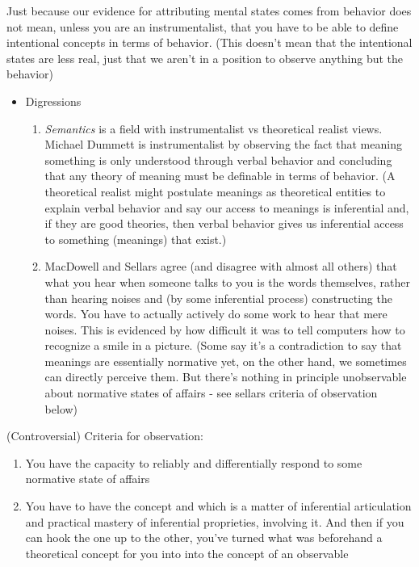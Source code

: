 Just because our evidence for attributing mental states comes from behavior does not mean, unless you are an instrumentalist, that you have to be able to define intentional concepts in terms of behavior. (This doesn't mean that the intentional states are less real, just that we aren't in a position to observe anything but the behavior)
\begin{itemize}
\item  Digressions
\begin{enumerate}
\item \emph{Semantics} is a field with instrumentalist vs theoretical realist views. Michael Dummett is instrumentalist by observing the fact that meaning something is only understood through verbal behavior and concluding that any theory of meaning must be definable in terms of behavior. (A theoretical realist might postulate meanings as theoretical entities to explain verbal behavior and say our access to meanings is inferential and, if they are good theories, then verbal behavior gives us inferential access to something (meanings) that exist.)
\item MacDowell and Sellars agree (and disagree with almost all others) that what you hear when someone talks to you is the words themselves, rather than hearing noises and (by some inferential process) constructing the words. You have to actually actively do some work to hear that mere noises. This is evidenced by how difficult it was to tell computers how to recognize a smile in a picture. (Some say it's a contradiction to say that meanings are essentially normative yet, on the other hand, we sometimes can directly perceive them. But there's nothing in principle unobservable about normative states of affairs - see sellars criteria of observation below)
\end{enumerate}
\end{itemize}

(Controversial) Criteria for observation:
\begin{enumerate}
\item You have the capacity to reliably and differentially respond to some normative state of affairs
\item You have to have the concept and which is a matter of inferential articulation and practical mastery of inferential proprieties, involving it. And then if you can hook the one up to the other, you've turned what was beforehand a theoretical concept for you into into the concept of an observable
\end{enumerate}


